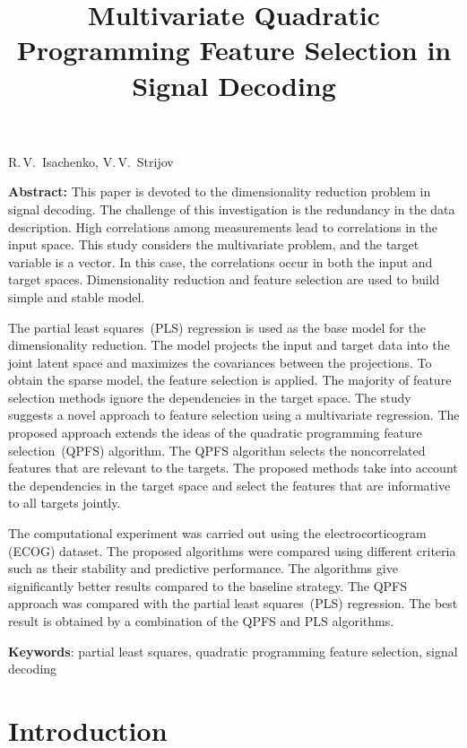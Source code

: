 \documentclass[12pt,twoside]{article}
\theoremstyle{definition}
\begin{document}
	
	\linenumbers
	
	\title
{Multivariate Quadratic Programming Feature Selection in Signal Decoding}
\date{}
\maketitle
\begin{center}
	R.\,V.~Isachenko,
	V.\,V.~Strijov
\end{center}
\textbf{Abstract:} 
This paper is devoted to the dimensionality reduction problem in signal decoding.
The challenge of this investigation is the redundancy in the data description. 
High correlations among measurements lead to correlations in the input space. 
This study considers the multivariate problem, and the target variable is a vector.
In this case, the correlations occur in both the input and target spaces.
Dimensionality reduction and feature selection are used to build simple and stable model.

The partial least squares~(PLS) regression is used as the base model for the dimensionality reduction.
The model projects the input and target data into the joint latent space and maximizes the covariances between the projections.
To obtain the sparse model, the feature selection is applied.
The majority of feature selection methods ignore the dependencies in the target space.
The study suggests a novel approach to feature selection using a multivariate regression.
The proposed approach extends the ideas of the quadratic programming feature selection~(QPFS) algorithm. 
The QPFS algorithm selects the noncorrelated features that are relevant to the targets. 
The proposed methods take into account the dependencies in the target space and select the features that are informative to all targets jointly.

The computational experiment was carried out using the electrocorticogram (ECOG) dataset. 
The proposed algorithms were compared using different criteria such as their stability and predictive performance.
The algorithms give significantly better results compared to the baseline strategy.
The QPFS approach was compared with the partial least squares~(PLS) regression.
The best result is obtained by a combination of the QPFS and PLS algorithms.

\bigskip
\textbf{Keywords}: partial least squares, quadratic programming feature selection, signal decoding

\section{Introduction}
\end{document}
